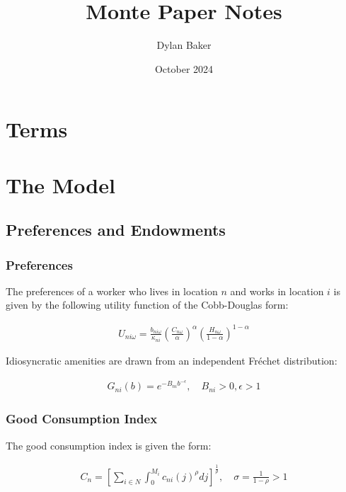 \documentclass[10pt]{article}
\title{Monte Paper Notes}
\author{Dylan Baker}
\date{October 2024}
\begin{document}
\maketitle

\tableofcontents

\section{Terms}



\section{The Model}

\subsection{Preferences and Endowments}

\subsubsection{Preferences}

The preferences of a worker who lives in
location $n$ and works in location $i$ 
is given by the following utility function
of the Cobb-Douglas form:

\begin{align}
    U_{n i \omega}=\frac{b_{n i \omega}}{\kappa_{n i}}\left(\frac{C_{n \omega}}{\alpha}\right)^\alpha\left(\frac{H_{n \omega}}{1-\alpha}\right)^{1-\alpha} \label{eq:utility_exp}
\end{align}

Idiosyncratic amenities 
are drawn from 
an independent Fréchet distribution:

\begin{align}
    G_{n i}(b)=e^{-B_{n i} b^{-\epsilon}}, \quad B_{n i}>0, \epsilon>1
\end{align}

\subsubsection{Good Consumption Index}

The good consumption index is given the form:

\begin{align}
    C_n=\left[\sum_{i \in N} \int_0^{M_i} c_{n i}(j)^\rho d j\right]^{\frac{1}{\rho}}, \quad \sigma=\frac{1}{1-\rho}>1
\end{align}
\end{document}
